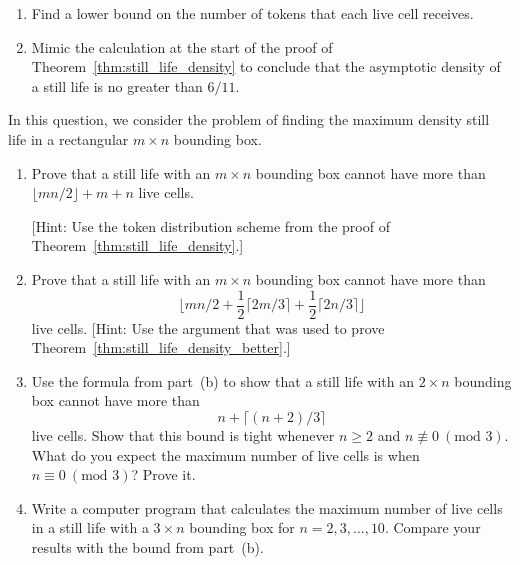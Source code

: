 \begin{multicols}{2}
\begin{problemstar}
\begin{enumerate}[label=\bf\color{ocre}(\alph*)]
			[Hint: Use Exercise~\ref{exer:still_lifes_6_neigh}.]
			
			\item Find a lower bound on the number of tokens that each live cell receives.
			
			\item Mimic the calculation at the start of the proof of Theorem~\ref{thm:still_life_density} to conclude that the asymptotic density of a still life is no greater than $6/11$.
		\end{enumerate}
	\end{problemstar}
	
	
	\mfilbreak
	
	
	\begin{problem}\label{exer:still_life_density_rectangle} 
		In this question, we consider the problem of finding the maximum density still life in a rectangular $m \times n$ bounding box.\smallskip
		
		\begin{enumerate}[label=\bf\color{ocre}(\alph*)]
			\item Prove that a still life with an $m \times n$ bounding box cannot have more than $\lfloor mn/2 \rfloor + m + n$ live cells.
			
			[Hint: Use the token distribution scheme from the proof of Theorem~\ref{thm:still_life_density}.]
			
			\item Prove that a still life with an $m \times n$ bounding box cannot have more than $$\Big\lfloor mn/2 + \frac{1}{2}\lceil 2m/3 \rceil + \frac{1}{2}\lceil 2n/3 \rceil \Big\rfloor$$ live cells. [Hint: Use the argument that was used to prove Theorem~\ref{thm:still_life_density_better}.]
			
			\item Use the formula from part~(b) to show that a still life with an $2 \times n$ bounding box cannot have more than
			$$
			n + \big\lceil(n+2)/3\big\rceil
			$$
			live cells. Show that this bound is tight whenever $n \geq 2$ and $n \not\equiv 0 \ (\text{mod } 3)$. What do you expect the maximum number of live cells is when $n \equiv 0 \ (\text{mod } 3)$? Prove it.
			
			\item Write a computer program that calculates the maximum number of live cells in a still life with a $3 \times n$ bounding box for $n = 2, 3, \ldots, 10$. Compare your results with the bound from part~(b).
		\end{enumerate}
	\end{problem}
	

\end{multicols}
